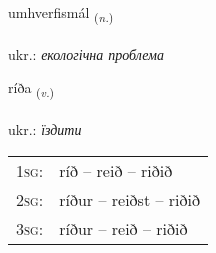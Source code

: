 \documentclass[frontgrid, backgrid]{flacards}\usepackage[]{graphicx}\usepackage[]{xcolor}
\begin{document}
\renewcommand{\flhead}{\vskip5pt \fboxsep=0pt {\small\bfseries\footnotesize Nafnorð | іменник}}
\renewcommand{\fcfoot}{\vskip5pt \fboxsep=0pt \hspace{2pt}{\small\bfseries\footnotesize 2K}}

\renewcommand{\blhead}{\vskip5pt {\small\bfseries\footnotesize Nafnorð | іменник }}
\renewcommand{\bcfoot}{\vskip5pt \hspace{2pt}{\small\bfseries\footnotesize 2K}}


{umhverfismál \small{\textsubscript{(\textit{n.})}} \\[1ex] %
\textphonetic{[ʏmkʰvɛrvɪsmaul]} \\
ukr.: \emph{екологічна проблема} \\  [2ex]
\renewcommand*{\arraystretch}{0.8}
}

\renewcommand{\flhead}{\vskip5pt \fboxsep=0pt {\small\bfseries\footnotesize Sagnorð | дієслово}}
\renewcommand{\fcfoot}{\vskip5pt \fboxsep=0pt \hspace{2pt}{\small\bfseries\footnotesize 2K}}

\renewcommand{\blhead}{\vskip5pt {\small\bfseries\footnotesize Sagnorð | дієслово }}
\renewcommand{\bcfoot}{\vskip5pt \hspace{2pt}{\small\bfseries\footnotesize 2K}}


{ríða \small{\textsubscript{(\textit{v.})}} \\[1ex] %
\textphonetic{[riːða]} \\
ukr.: \emph{їздити} \\  [2ex]
\renewcommand*{\arraystretch}{0.8}
\begin{tabular}{p{1cm}l}
\textsc{1sg}: & ríð -- reið -- riðið \\ 
\textsc{2sg}: & ríður -- reiðst -- riðið \\ 
\textsc{3sg}: & ríður -- reið -- riðið \\ 
\end{tabular}
}
\end{document}

